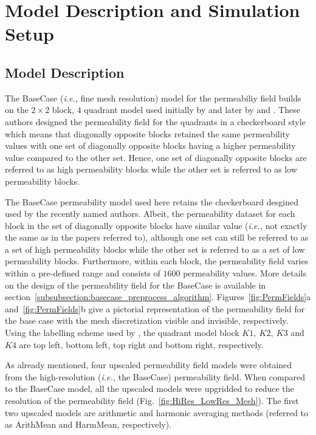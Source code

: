 \documentclass[preprint,12pt]{elsarticle}
\newcommand{\ie}{{\it i.e., }}
\begin{document}
\section{Model Description and Simulation Setup}\label{section:model_simulation}

\subsection{Model Description}\label{subsection:model}
The BaseCase  (\ie fine mesh resolution) model for the permeabiliy field builds on the $2 \times 2$ block, $4$ quadrant model used initially by \citet{Cardwell_1945} and later by \citet{Yeo2001} and \citet{dawe_2008}. These authors designed the permeability field for the quadrants in a checkerboard style which means that diagonally opposite blocks retained the same permeability values with one set of diagonally opposite blocks having a higher permeability value compared to the other set. Hence, one set of diagonally opposite blocks are referred to as high permeability blocks while the other set is referred to as low permeability blocks.

The BaseCase permeability model used here retains the checkerboard desgined used by the recently named authors. Albeit, the permeability dataset for each block in the set of diagonally opposite blocks have similar value (\ie not exactly the same as in the papers referred to), although one set can still be referred to as a set of high permeability blocks while the other set is referred to as a set of low permeability blocks. Furthermore, within each block, the permeability field varies within a pre-defined range and consists of $1600$ permeability values. More details on the design of the permeability field for the BaseCase is available in section~\ref{subsubsection:basecase_preprocess_algorithm}. Figures~\ref{fig:PermFields}a and~\ref{fig:PermFields}b give a pictorial representation of the permeability field for the base case with the mesh discretization visible and invisible, respectively.  Using the labelling scheme used by \citet{dawe_2008}, the quadrant model block $K1,~K2,~K3$ and $K4$ are top left, bottom left, top right and bottom right, respectively.

As already mentioned, four upscaled permeability field models were obtained from the high-resolution (\ie the BaseCase) permeability field. When compared to the BaseCase model, all the upscaled models were upgridded to reduce the resolution of the permeability field (Fig.~\ref{fig:HiRes_LowRes_Mesh}). The first two upscaled models are arithmetic and harmonic averaging methods  (referred to as ArithMean and HarmMean, respectively).
\end{document}
